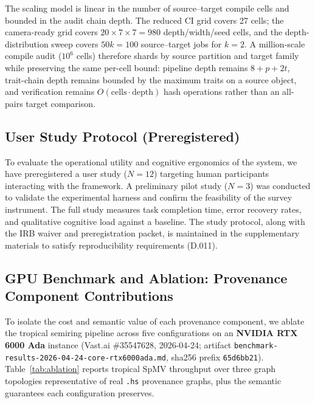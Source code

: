 \documentclass[sigconf,nonacm]{acmart}
\newcommand{\hscore}{\texttt{.hs}}
\begin{document}
The scaling model is linear in the number of source--target compile cells and
bounded in the audit chain depth. The reduced CI grid covers 27 cells; the
camera-ready grid covers $20 \times 7 \times 7 = 980$ depth/width/seed cells,
and the depth-distribution sweep covers $50k=100$ source--target jobs for
$k=2$. A million-scale compile audit ($10^6$ cells) therefore shards by source
partition and target family while preserving the same per-cell bound:
pipeline depth remains $8{+}p{+}2t$, trait-chain depth remains bounded by the
maximum traits on a source object, and verification remains
$O(\text{cells} \cdot \text{depth})$ hash operations rather than an
all-pairs target comparison.


\subsection{User Study Protocol (Preregistered)}
\label{sec:user-study}

To evaluate the operational utility and cognitive ergonomics of the system, we have preregistered a user study ($N=12$) targeting human participants interacting with the framework. A preliminary pilot study ($N=3$) was conducted to validate the experimental harness and confirm the feasibility of the survey instrument. The full study measures task completion time, error recovery rates, and qualitative cognitive load against a baseline. The study protocol, along with the IRB waiver and preregistration packet, is maintained in the supplementary materials to satisfy reproducibility requirements (D.011).

\subsection{GPU Benchmark and Ablation: Provenance Component Contributions}
\label{sec:ablation}

To isolate the cost and semantic value of each provenance component, we
ablate the tropical semiring pipeline across five configurations on an
\textbf{NVIDIA RTX 6000 Ada} instance (Vast.ai \#35547628, 2026-04-24;
artifact \texttt{benchmark-results-2026-04-24-core-rtx6000ada.md},
sha256 prefix \texttt{65d6bb21}).  Table~\ref{tab:ablation} reports
tropical SpMV throughput over three graph topologies representative of
real \hscore{} provenance graphs, plus the semantic guarantees each
configuration preserves.
\end{document}
